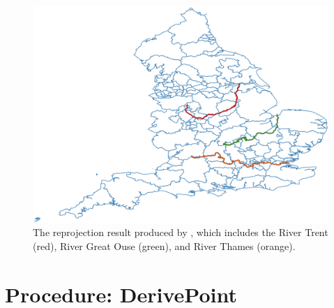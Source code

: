 {\begin{figure}[h!]
    \centering
    \includegraphics[width=\columnwidth]{figure/qgis/all_rivers.png}
    \caption{The reprojection result produced by , which includes the River Trent (red), River Great Ouse (green), and River Thames (orange).}
    \label{fig:all_rivers}
\end{figure}
}

\section{Procedure: DerivePoint}


